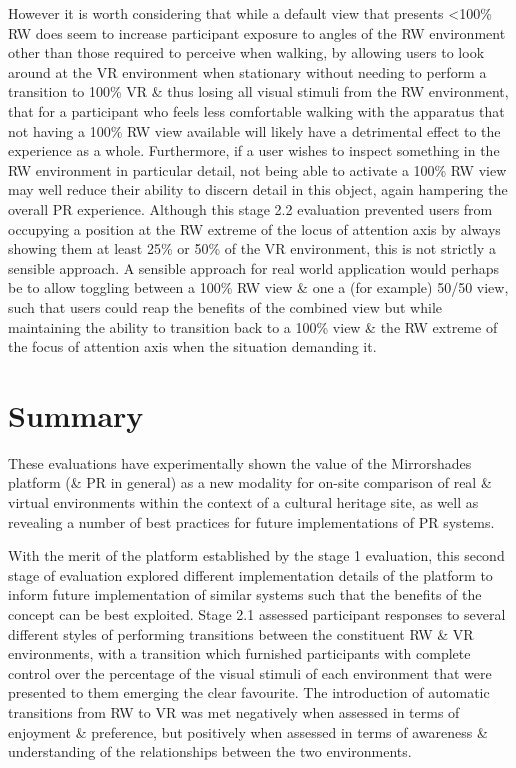 However it is worth considering that while a default view that presents \textless 100\% RW does seem to increase participant exposure to angles of the RW environment other than those required to perceive when walking, by allowing users to look around at the VR environment when stationary without needing to perform a transition to 100\% VR \& thus losing all visual stimuli from the RW environment, that for a participant who feels less comfortable walking with the apparatus that not having a 100\% RW view available will likely have a detrimental effect to the experience as a whole. Furthermore, if a user wishes to inspect something in the RW environment in particular detail, not being able to activate a 100\% RW view may well reduce their ability to discern detail in this object, again hampering the overall PR experience. Although this stage 2.2 evaluation prevented users from occupying a position at the RW extreme of the locus of attention axis by always showing them at least 25\% or 50\% of the VR environment, this is not strictly a sensible approach. A sensible approach for real world application would perhaps be to allow toggling between a 100\% RW view \& one a (for example) 50/50 view, such that users could reap the benefits of the combined view but while maintaining the ability to transition back to a 100\% view \& the RW extreme of the focus of attention axis when the situation demanding it.


\section{Summary}

These evaluations have experimentally shown the value of the Mirrorshades platform (\& PR in general) as a new modality for on-site comparison of real \& virtual environments within the context of a cultural heritage site, as well as revealing a number of best practices for future implementations of PR systems.

With the merit of the platform established by the stage 1 evaluation, this second stage of evaluation explored different implementation details of the platform to inform future implementation of similar systems such that the benefits of the concept can be best exploited. Stage 2.1 assessed participant responses to several different styles of performing transitions between the constituent RW \& VR environments, with a transition which furnished participants with complete control over the percentage of the visual stimuli of each environment that were presented to them emerging the clear favourite. The introduction of automatic transitions from RW to VR was met negatively when assessed in terms of enjoyment \& preference, but positively when assessed in terms of awareness \& understanding of the relationships between the two environments.

